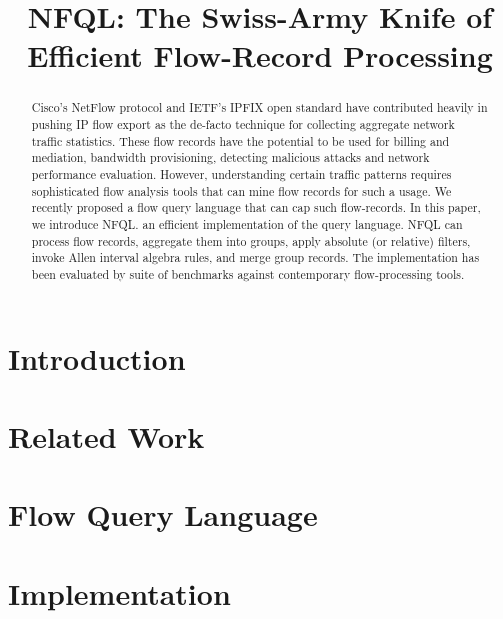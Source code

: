 \documentclass[conference]{IEEEtran}
\begin{document}
\title{NFQL: The Swiss-Army Knife of Efficient Flow-Record Processing}

\author{ }

\maketitle


\begin{abstract} Cisco's NetFlow protocol and IETF's IPFIX open standard have
  contributed heavily in pushing IP flow export as the de-facto technique for
  collecting aggregate network traffic statistics. These flow records have the
  potential to be used for billing and mediation, bandwidth provisioning,
  detecting malicious attacks and network performance evaluation. However,
  understanding certain traffic patterns requires sophisticated flow analysis
  tools that can mine flow records for such a usage. We recently proposed a
  flow query language that can cap such flow-records. In this paper, we
  introduce \ac{NFQL}. an efficient implementation of the query language.
  \ac{NFQL} can process flow records, aggregate them into groups, apply
  absolute (or relative) filters, invoke Allen interval algebra rules, and
  merge group records. The implementation has been evaluated by suite of
  benchmarks against contemporary flow-processing tools.\end{abstract}



\section{Introduction}
\label{sec:introduction}
\section{Related Work}
\label{sec:relatedwork}
\section{Flow Query Language}
\label{sec:design}
\section{Implementation}
\label{sec:implementation}
\end{document}
